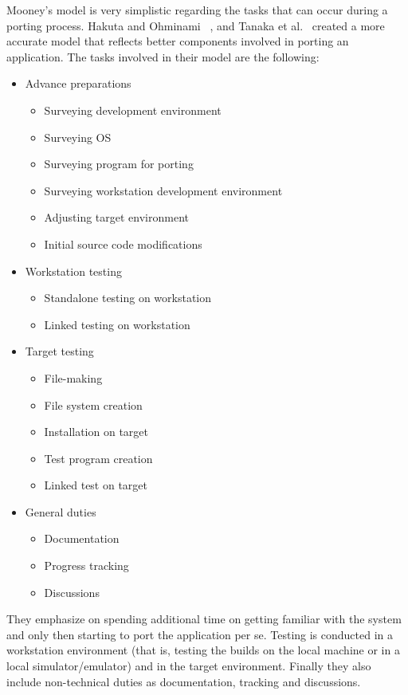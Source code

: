 Mooney's model is very simplistic regarding the tasks that can occur during a
porting process. Hakuta and Ohminami~ \cite{hakuta}, and Tanaka et
al.~\cite{tanaka} created a more accurate model that reflects better components
involved in porting an application. The tasks involved in their model are the
following:
\begin{itemize}
    \item Advance preparations
        \begin{itemize}
            \item Surveying development environment
            \item Surveying OS
            \item Surveying program for porting
            \item Surveying workstation development environment
            \item Adjusting target environment
            \item Initial source code modifications
        \end{itemize}
    \item Workstation testing
        \begin{itemize}
            \item Standalone testing on workstation
            \item Linked testing on workstation
        \end{itemize}
    \item Target testing
        \begin{itemize}
            \item File-making
            \item File system creation
            \item Installation on target
            \item Test program creation
            \item Linked test on target
        \end{itemize}
    \item General duties
        \begin{itemize}
            \item Documentation
            \item Progress tracking
            \item Discussions
        \end{itemize}
\end{itemize}

They emphasize on spending additional time on getting familiar with the system
and only then starting to port the application per se. Testing is conducted in a
workstation environment (that is, testing the builds on the local machine or in
a local simulator/emulator) and in the target environment. Finally they also
include non-technical duties as documentation, tracking and discussions.


